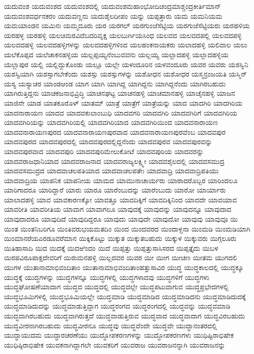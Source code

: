 {ಯದುವಂಶ
ಯದುವಂಶದ
ಯದುವಂಶದಲ್ಲಿ
ಯದುವಂಶಮಹಾಂಭೋದಿಚಂದ್ರಮಾಶ್ಚಂದ್ರಕೀರ್ತಿಮಾನ್
ಯದುವಂಶವರ್ಧನಕರಂ
ಯದುವಣ್ಣನು
ಯದುಶೈಲದೀಪಂ
ಯನ್ನು
ಯಪ್ಪತ್ತಾರು
ಯಮ
ಯಮನಿಯಮ
ಯಮಯಾಂಡನ
ಯಮಿನಃ
ಯಮ್ಮದೂರು
ಯರ
ಯರಗಲ್
ಯರಗುಂಜೆಸೆಟ್ಟಿಯ
ಯರಗುಜೆಸೆಟ್ಟಿಯರು
ಯರಹಳಿಯ
ಯರಹಳ್ಳ
ಯರಹಳ್ಳಿ
ಯಲಚಿಮರವಿದೆಬದರಿವೃಕ್ಷ
ಯಲಬುರ್ಗಿಯಸಿಂಧ
ಯಲವದ
ಯಲವದಪಲ್ಲಿ
ಯಲವದಪಳ್ಳಿ
ಯಲವದಹಳ್ಳಿ
ಯಲವದಹಳ್ಳಿಗಳನ್ನು
ಯಲವದಹಳ್ಳಿಗಳಿಂದ
ಯಲಹಂಕನಾಯಕರು
ಯಲಾದಹಳ್ಳಿ
ಯಲಿವಾಲ
ಯಲು
ಯಲೆಕೊಪ್ಪದ
ಯಲೆಚಾಕನಹಳ್ಳಿಯ
ಯಲ್ಲಪ್ಪಯ್ಯನೆಂಬುವವನು
ಯಲ್ಲಯ್ಯ
ಯಲ್ಲಾದಹಳ್ಳಿ
ಯಲ್ಲಾದಹಳ್ಳಿಯ
ಯಲ್ಲಾಪುರ
ಯಲ್ಲಿ
ಯಲ್ಲಿದ್ದುಕೊಂಡು
ಯಲ್ಲೂ
ಯಲ್ಲೇ
ಯಳಂದೂರಿನ
ಯಳವಂದೂರು
ಯವರ
ಯವರು
ಯಶಸ್ವಿನಿ
ಯಶಸ್ವಿಯಾಗಿ
ಯಶಸ್ಸಾಗಬೇಕೆಂದು
ಯಶಸ್ಸು
ಯಶಸ್ಸುಗಳನ್ನು
ಯಶೋಧನ
ಯಶೋಧರ
ಯಸ್ಮನ್ರಂಜಯತಿ
ಯಸ್ಮಿನ್
ಯಸ್ಯ
ಯಸ್ಯಾಚರ
ಯಾಂಡಆಂಡ
ಯಾಗ
ಯಾಗಿ
ಯಾಗಿದ್ದ
ಯಾಗಿದ್ದನು
ಯಾಗಿದ್ದನೆಂದು
ಯಾಗಿರಬಹುದು
ಯಾಗಿರುತ್ತಿದ್ದನು
ಯಾಚಕಜನಾಭಿವ್ರಿದ್ಧಿ
ಯಾಚನಘಟ್ಟ
ಯಾಚನಹಳ್ಳಿ
ಯಾಚಮಾನಹಳ್ಳಿ
ಯಾಚೈನಹಳ್ಳಿ
ಯಾಜನ
ಯಾಜಿನೇ
ಯಾಡ
ಯಾತಕೂರೊಳ್
ಯಾತಮ್
ಯಾತ್ರೆ
ಯಾತ್ರೆಗೆ
ಯಾತ್ರೆಯನ್ನು
ಯಾದ
ಯಾದಗಿರಿ
ಯಾದಗಿರಿಯ
ಯಾದನಾರಾಯಣ
ಯಾದವ
ಯಾದವಕುಲಾಂಬುಧಿ
ಯಾದವಗರಿ
ಯಾದವಗಿರಿ
ಯಾದವಗಿರಿಗೆ
ಯಾದವಗಿರಿಯ
ಯಾದವಗಿರಿಯನ್ನು
ಯಾದವಗಿರಿಯಲ್ಲಿ
ಯಾದವಗಿರಿಯಾದ
ಯಾದವಗಿರಿಯಿಂದ
ಯಾದವನಾರಾಯಣ
ಯಾದವನಾರಾಯಣಪುರದ
ಯಾದವನಾರಾಯಣಪುರವಾದ
ಯಾದವನಾರಾಯಣಪುರವೆಂಬ
ಯಾದವಪುರ
ಯಾದವಪುರದ
ಯಾದವಪುರದಲ್ಲಿ
ಯಾದವಪುರದಲ್ಲಿದ್ದನೆಂದು
ಯಾದವಪುರವ
ಯಾದವಪುರವನ್ನು
ಯಾದವಪುರವಾದ
ಯಾದವಪುರಿ
ಯಾದವಪುರಿಮೇಲುಕೋಟೆ
ಯಾದವಪುರಿಯ
ಯಾದವರನ್ನು
ಯಾದವರಾಜಧಾನಿಯಾದ
ಯಾದವರಾಜನಾದ
ಯಾದವರಾಜ್ಯಲಕ್ಷ್ಮೀ
ಯಾದವಶೈಲದಲ್ಲಿ
ಯಾದವಸಮುದ್ರ
ಯಾದವಸಮುದ್ರದ
ಯಾದವಾಚಲಪತಿಯಾದ
ಯಾದವಾಚಲಪತೇಃ
ಯಾದವಾದ್ರಿ
ಯಾದವಾದ್ರಿಪತಿಯು
ಯಾದವಾದ್ರಿಯ
ಯಾಪನಿಕ
ಯಾಪನೀಯ
ಯಾಮದ
ಯಾಮುನಾಚಾರ್ಯರು
ಯಾರಾದರೊಬ್ಬರ
ಯಾರಿಂದಲೂ
ಯಾರಿಗಾದರೂ
ಯಾರಿದ್ದಾರೆ
ಯಾರು
ಯಾರೂ
ಯಾರೆಂಬುದನ್ನು
ಯಾರೆಂಬುದು
ಯಾರೋ
ಯಾರ್ಯಾರು
ಯಾಲಾದಹಳ್ಳಿ
ಯಾವ
ಯಾವಕಾರಣಕ್ಕೋ
ಯಾವತ್ತೂ
ಯಾವದಿಕ್ಕಿಗೆ
ಯಾವದಿಕ್ಕಿನಿಂದ
ಯಾವದೇ
ಯಾವಯಾವ
ಯಾವರೀತಿ
ಯಾವರೀತಿಯ
ಯಾವಾಗ
ಯಾವಾಗಲೂ
ಯಾವುದಕ್ಕೆ
ಯಾವುದನ್ನು
ಯಾವುದನ್ನೂ
ಯಾವುದಾದ
ಯಾವುದಾದರೂ
ಯಾವುದಿದೆ
ಯಾವುದಿದ್ದರೂ
ಯಾವುದು
ಯಾವುದೇ
ಯಾವುದೋ
ಯಾವುವು
ಯಾವುವೂ
ಯಿ
ಯಿಂತ
ಯಿಂತನಿಬರಿಗೂ
ಯಿಂತಿವರುಭಯಮತದಿಂ
ಯಿಂದ
ಯಿಂದವರದ
ಯಿಂದಾಳ್ದನಾ
ಯಿಂಮಡಿ
ಯಿಂಮಡಿಯಾಗಿ
ಯಿಂಮಾನರೆಯಎರಡೂವರೆಮಾನ
ಯಿಕ್ಕಿಕೊಟ್ಟು
ಯಿಕ್ಕುತ
ಯಿಕ್ಕುತಬಹುದು
ಯಿಕ್ಕುಳ
ಯಿಕ್ಕುವರು
ಯಿಗ್ಗಲೂರು
ಯಿತಿಹಾಸಾದಿ
ಯಿದ
ಯಿದಕ್ಕೆ
ಯಿದಱಿಂದಂ
ಯಿದೆ
ಯಿಪ್ಪತ್ತು
ಯಿಪ್ಪತ್ತುಸಾಸಿಸರದ
ಯಿಪ್ಪತ್ತೈದು
ಯಿಬಳ
ಯಿರಪವಿರೂಪಾಕ್ಷದೇವರಿಗೆ
ಯಿರುಮನಹಳ್ಳಿ
ಯಿಲ್ಲದವರ
ಯಿವರ
ಯೀ
ಯೀಗ
ಯೀಚಣ
ಯೀತಮ
ಯುಗದಲಿ
ಯುಗಳ
ಯುತಾನಾಮಾಭಿವಂದಿತಾಂ
ಯುತಾನಾಮಾಭಿವಂದಿತಾಂಹತ್ತುಸಾವಿರ
ಯುದ್ಧ
ಯುದ್ಧಕಾಲದಲ್ಲಿ
ಯುದ್ಧಕ್ಕೂ
ಯುದ್ಧಕ್ಕೆ
ಯುದ್ಧಗಳನ್ನು
ಯುದ್ಧಗಳನ್ನೂ
ಯುದ್ಧಗಳಲ್ಲಿ
ಯುದ್ಧಗಳಾದವು
ಯುದ್ಧಗಳಿಗೆ
ಯುದ್ಧಗಳು
ಯುದ್ಧಘೋಷಣೆಯಾದಾಗ
ಯುದ್ಧದ
ಯುದ್ಧದಲ್ಲಿ
ಯುದ್ಧದಲ್ಲೇ
ಯುದ್ಧಪಟುವಾಗುವ
ಯುದ್ಧಪ್ರಭೇದಗಳಲ್ಲಿ
ಯುದ್ಧಭೂಮಿಗಳಲ್ಲಿ
ಯುದ್ಧಭೂಮಿಯಲ್ಲೇ
ಯುದ್ಧಮಾಡಿ
ಯುದ್ಧಮಾಡಿದ
ಯುದ್ಧಮಾಡಿದನು
ಯುದ್ಧಮಾಡಿದುದಕ್ಕೆ
ಯುದ್ಧಮಾಡಿದುದನ್ನು
ಯುದ್ಧಮಾಡುತ್ತಿದ್ದಾಗ
ಯುದ್ಧರಂಗದ
ಯುದ್ಧರಂಗದಲ್ಲಿ
ಯುದ್ಧವನ್ನು
ಯುದ್ಧವಮಾಡಿ
ಯುದ್ಧವಾಗಿರಬಹುದು
ಯುದ್ಧವಾಗಿರುತ್ತದೆ
ಯುದ್ಧವಾಡುತ್ತಿರುವ
ಯುದ್ಧವಾದ
ಯುದ್ಧವಾದಾಗ
ಯುದ್ಧವಿರಬಹುದು
ಯುದ್ಧವೀರನಾಗಿರಬಹುದು
ಯುದ್ಧವೀರನೂ
ಯುದ್ಧವು
ಯುದ್ಧವೆಂದೇ
ಯುದ್ಧವೇ
ಯುದ್ಧಾನಂತರದಲ್ಲಿ
ಯುದ್ಧಾಯುದಮ
ಯುದ್ಧಾರಚರಣೆಯು
ಯುದ್ಧೋಪಕರಣಗಳನ್ನು
ಯುದ್ಧೋಪಕರಣಗಳು
ಯುಧಿಷ್ಟಿರಾಭಿಷೇಕ
ಯುಧಿಷ್ಠಿರಾಭಿಷೇಕ
ಯುವಕನಾಗಿದ್ದಾಗಲೇ
ಯುವಕರಿಗೆ
ಯುವರಾಜ
ಯುವರಾಜನನ್ನಾಗಿ
ಯುವರಾಜನನ್ನು
}
